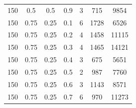 \documentclass[12pt]{report}
\begin{document}
\begin{table}[H]
\begin{center}
\begin{tabular}{|c|c|c|c|c|c|c|}
				150 & 0.5 & 0.5 & 0.9 & 3 & 715 & 9854 \\
				150 & 0.75 & 0.25 & 0.1 & 6 & 1728 & 6526 \\
				150 & 0.75 & 0.25 & 0.2 & 4 & 1458 & 11115 \\
				150 & 0.75 & 0.25 & 0.3 & 4 & 1465 & 14121 \\
				150 & 0.75 & 0.25 & 0.4 & 3 & 675 & 5651 \\
				150 & 0.75 & 0.25 & 0.5 & 2 & 987 & 7760 \\
				150 & 0.75 & 0.25 & 0.6 & 3 & 1143 & 8571 \\
				150 & 0.75 & 0.25 & 0.7 & 6 & 970 & 11273 \\
				\hline	
			\end{tabular}
		\end{center}
	\end{table}
\end{document}
